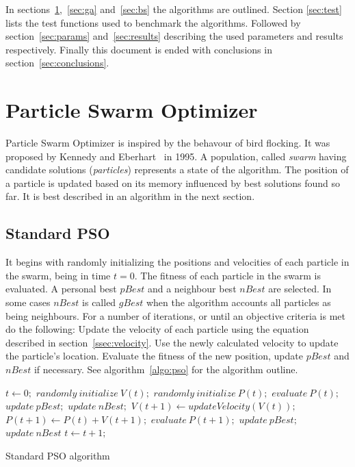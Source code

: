 \documentclass{acm_proc_article-sp}
\begin{document}
In sections~\ref{sec:pso},~\ref{sec:ga} and~\ref{sec:bs} the algorithms are outlined. Section \ref{sec:test} lists the test functions used to benchmark the algorithms. Followed by section~\ref{sec:params} and~\ref{sec:results} describing the used parameters and results respectively. Finally this document is ended with conclusions in section~\ref{sec:conclusions}.

\section{Particle Swarm Optimizer}\label{sec:pso}
Particle Swarm Optimizer is inspired by the behavour of bird flocking. It was proposed by Kennedy and Eberhart~\cite{KEN95} in 1995. A population, called \emph{swarm} having candidate solutions (\emph{particles}) represents a state of the algorithm. The position of a particle is updated based on its memory influenced by best solutions found so far. It is best described in an algorithm in the next section.

\subsection{Standard PSO}
It begins with randomly initializing the positions and velocities of each particle in the swarm, being in time $t = 0$. The fitness of each particle in the swarm is evaluated. A personal best $pBest$ and a neighbour best $nBest$ are selected. In some cases $nBest$ is called $gBest$ when the algorithm accounts all particles as being neighbours. For a number of iterations, or until an objective criteria is met do the following:
Update the velocity of each particle using the equation described in section~\ref{ssec:velocity}. Use the newly calculated velocity to update the particle's location. Evaluate the fitness of the new position, update $pBest$ and $nBest$ if necessary. See algorithm~\ref{algo:pso} for the algorithm outline.

  \begin{algorithm}[h]
  \begin{algorithmic}
    \STATE $t \gets 0;$
    \STATE $randomly\: initialize\: V(t);$
    \STATE $randomly\: initialize\: P(t);$
    \STATE $evaluate\: P(t);$
    \STATE $update\: pBest;$
    \STATE $update\: nBest;$
    \REPEAT
      \STATE $V(t+1) \gets updateVelocity(V(t));$
      \STATE $P(t+1) \gets P(t) + V(t+1);$
      \STATE $evaluate\: P(t+1);$
      \STATE $update\: pBest;$
      \STATE $update\: nBest$
      \STATE $t \gets t + 1;$
  \end{algorithmic}
  \caption{Standard PSO algorithm}\label{algo:pso}
  \end{algorithm}
\end{document}
